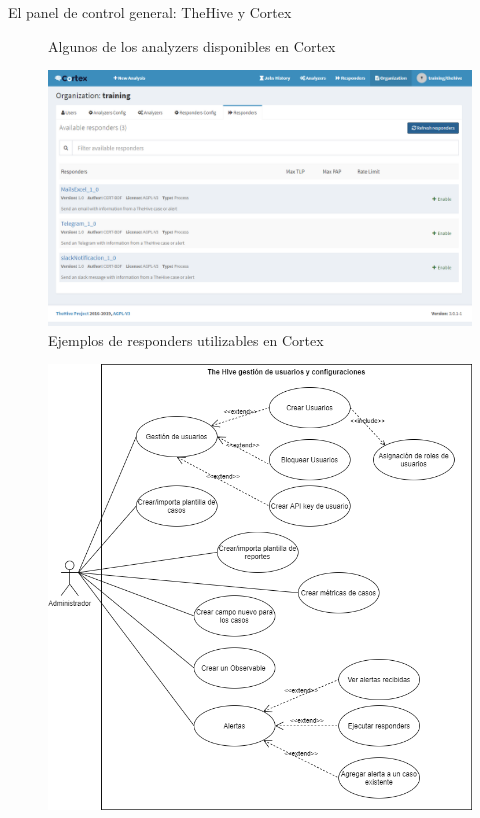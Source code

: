 \begin{section}{El panel de control general: TheHive y Cortex}
\begin{figure}[H]
        \caption{Algunos de los analyzers disponibles en Cortex}
        \label{fig:analizers_disponibles}
     \end{figure}
     \begin{figure}[H]
        \centering
        \includegraphics[width=1\textwidth]{./iteracion_1_imagenes/figura_27_responders_cortex.png}
        \caption{Ejemplos de responders utilizables en Cortex}
        \label{fig:ejemplos_responders_cortex}
     \end{figure}
     \begin{figure}[H]
        \centering
        \includegraphics[width=1\textwidth]{./iteracion_1_imagenes/figura_28_thehive_user_conf.png}

\end{figure}
\end{section}
